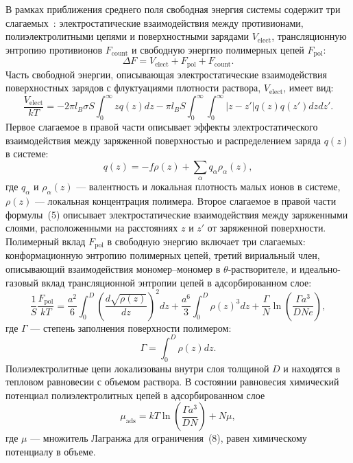\documentclass[12pt,a4paper]{article}
\begin{document}
В рамках приближения среднего поля свободная энергия системы содержит три слагаемых~\cite{Varoqui1991, Varoqui1993, Borukhov1995, Chatellier1996, Borukhov1998, Joanny1999}: электростатические взаимодействия между противионами, полиэлектролитными цепями и поверхностными зарядами $V_{\text{elect}}$, трансляционную энтропию противионов $F_{\text{count}}$ и свободную энергию полимерных цепей $F_{\text{pol}}$:
\begin{equation}
\Delta F = V_{\text{elect}} + F_{\text{pol}} + F_{\text{count}}.
\end{equation}
Часть свободной энергии, описывающая электростатические взаимодействия поверхностных зарядов с флуктуациями плотности раствора, $V_{\text{elect}}$, имеет вид:
\begin{equation}
\frac{V_{\text{elect}}}{k T} = -2\pi l_B \sigma S \int_0^\infty z q(z) dz - \pi l_B S \int_0^\infty \int_0^\infty |z - z'| q(z) q(z') dz dz'.
\end{equation}
Первое слагаемое в правой части описывает эффекты электростатического взаимодействия между заряженной поверхностью и распределением заряда $q(z)$ в системе:
\begin{equation}
q(z) = -f \rho(z) + \sum_\alpha q_\alpha \rho_\alpha(z),
\end{equation}
где $q_\alpha$ и $\rho_\alpha(z)$ --- валентность и локальная плотность малых ионов в системе, $\rho(z)$ --- локальная концентрация полимера. Второе слагаемое в правой части формулы~(5) описывает электростатические взаимодействия между заряженными слоями, расположенными на расстояниях $z$ и $z'$ от заряженной поверхности. Полимерный вклад $F_{\text{pol}}$ в свободную энергию включает три слагаемых: конформационную энтропию полимерных цепей, третий вириальный член, описывающий взаимодействия мономер--мономер в $\theta$-растворителе, и идеально-газовый вклад трансляционной энтропии цепей в адсорбированном слое:
\begin{equation}
\frac{1}{S}\frac{F_{\text{pol}}}{k T} = \frac{a^2}{6} \int_0^D \left( \frac{d\sqrt{\rho(z)}}{dz} \right)^2 dz + \frac{a^6}{3} \int_0^D \rho(z)^3 dz + \frac{\Gamma}{N} \ln\left( \frac{\Gamma a^3}{D N e} \right),
\end{equation}
где $\Gamma$ --- степень заполнения поверхности полимером:
\begin{equation}
\Gamma = \int_0^D \rho(z) dz.
\end{equation}
Полиэлектролитные цепи локализованы внутри слоя толщиной $D$ и находятся в тепловом равновесии с объемом раствора. В состоянии равновесия химический потенциал полиэлектролитных цепей в адсорбированном слое
\begin{equation}
\mu_{\text{ads}} = k T \ln\left( \frac{\Gamma a^3}{D N} \right) + N\mu,
\end{equation}
где $\mu$ --- множитель Лагранжа для ограничения~(8), равен химическому потенциалу в объеме.
\end{document}
